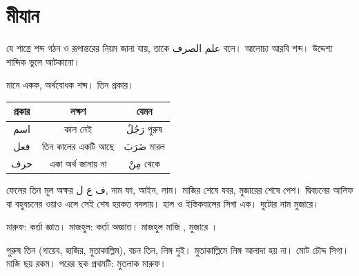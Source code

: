 \newpage

\section{মীযান}

\noindent যে শাস্ত্রে শব্দ গঠন ও রূপান্তরের নিয়ম জানা যায়, তাকে
{\arabicfont \textarabic{علم الصرف}} বলে।
আলোচ্য আরবি শব্দ। উদ্দেশ্য শাব্দিক ভুলে আটকানো।

\vspace{0.35cm}

 মানে একক, অর্থবোধক শব্দ। তিন প্রকার।

\vspace{0.2cm}

\begingroup
\setlength{\arrayrulewidth}{0.5pt}
\setlength{\tabcolsep}{4pt}
\renewcommand{\arraystretch}{1.7}

\noindent\begin{tabularx}{\textwidth}{|C|C|C|}
  \hline
  {\color{white}\textbf{প্রকার}} &
  {\color{white}\textbf{লক্ষণ}} &
  {\color{white}\textbf{যেমন}} \\
  \hline
  {\arabicfont \textarabic{اسم}} &
  কাল নেই &
  {\arabicfont \textarabic{رَجُلٌ}} পুরুষ \\
  \hline
  {\arabicfont \textarabic{فعل}} &
  তিন কালের একটি আছে &
  {\arabicfont \textarabic{ضَرَبَ}} মারল \\
  \hline
  {\arabicfont \textarabic{حرف}} &
  একা অর্থ জানায় না &
  {\arabicfont \textarabic{مِنْ}} থেকে \\
  \hline
\end{tabularx}
\endgroup

\vspace{0.4cm}

\noindent ফেলের তিন মূল অক্ষর {\arabicfont \textarabic{ف ع ل}},
নাম ফা, আইন, লাম।
মাজির শেষে যবর, মুজারের শেষে পেশ।
দ্বিবচনের আলিফ বা বহুবচনের ওয়াও এলে সেই শেষ হরকত বদলায়।
হাল ও ইস্তিকবালের সিগা এক। দুটোর নাম মুজারে।

\vspace{0.3cm}

\noindent মারুফ: কর্তা জ্ঞাত।
মাজহুল: কর্তা অজ্ঞাত।
মাজহুল মাজি {\arabicfont \majhulmadi},
মুজারে {\arabicfont \majhulmud}।

\vspace{0.25cm}

\noindent পুরুষ তিন (গায়েব, হাজির, মুতাকাল্লিম), বচন তিন, লিঙ্গ দুই।
মুতাকাল্লিমে লিঙ্গ আলাদা হয় না। মোট চৌদ্দ সিগা।
মাজি ছয় রকম। পরের ছক প্রথমটি: মুতলাক মারুফ।
